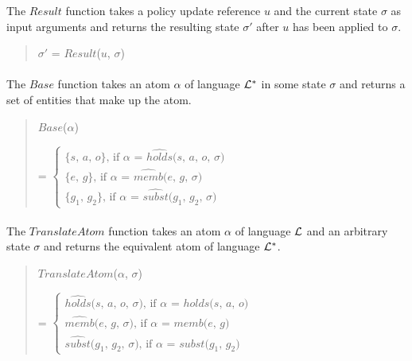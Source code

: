 \documentclass[10pt, twocolumn]{article}
\begin{document}
          The $Result$ function takes a policy update reference $u$ and the
          current state $\sigma$ as input arguments and returns the resulting
          state $\sigma'$ after $u$ has been applied to $\sigma$.
 
          \begin{quote}
            $\sigma'$ = $Result$($u$, $\sigma$)
          \end{quote}

        \paragraph{}

          The $Base$ function takes an atom $\alpha$ of language ${\cal L}^{*}$
          in some state $\sigma$ and returns a set of entities that make up
          the atom.

          \begin{quote}
            $Base$($\alpha$)
 
            = 
            \begin{math}
              \begin{cases}
                \mbox{\{$s$, $a$, $o$\}, if $\alpha$ = $\hat{holds}$($s$, $a$, $o$, $\sigma$)} \\
                \mbox{\{$e$, $g$\}, if $\alpha$ = $\hat{memb}$($e$, $g$, $\sigma$)} \\
                \mbox{\{$g_{1}$, $g_{2}$\}, if $\alpha$ = $\hat{subst}$($g_{1}$, $g_{2}$, $\sigma$)}
              \end{cases}
            \end{math}
          \end{quote}

        \paragraph{}

          The $TranslateAtom$ function takes an atom $\alpha$ of language
          ${\cal L}$ and an arbitrary state $\sigma$ and returns the equivalent
          atom of language ${\cal L}^{*}$.
 
          \begin{quote}
            $TranslateAtom$($\alpha$, $\sigma$)
 
            = 
            \begin{math}
              \begin{cases}
                \mbox{$\hat{holds}$($s$, $a$, $o$, $\sigma$), if $\alpha$ = $holds$($s$, $a$, $o$)} \\
                \mbox{$\hat{memb}$($e$, $g$, $\sigma$), if $\alpha$ = $memb$($e$, $g$)} \\
                \mbox{$\hat{subst}$($g_{1}$, $g_{2}$, $\sigma$), if $\alpha$ = $subst$($g_{1}$, $g_{2}$)}
              \end{cases}
            \end{math}
          \end{quote}
\end{document}
